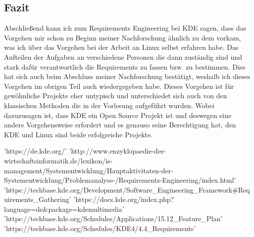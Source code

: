 \subsection{Fazit}
Abschließend kann ich zum Requirements Engineering bei KDE sagen, dass das
Vorgehen mir schon zu Beginn meiner Nachforschung ähnlich zu dem vorkam, was ich
über das Vorgehen bei der Arbeit an Linux selbst erfahren habe. Das Aufteilen
der Aufgaben an verschiedene Personen die dann zuständig sind und stark dafür
verantwortlich die Requirements zu fassen bzw. zu bestimmen. Dies hat sich
auch beim Abschluss meiner Nachforschung bestätigt, weshalb ich dieses Vorgehen
im obrigen Teil auch wiedergegeben habe. Dieses Vorgehen ist für gewöhnliche
Projekte eher untypisch und unterschiedet sich auch von den klassischen Methoden
die in der Vorlesung aufgeführt wurden. %
Wobei dazuzusagen ist, dass KDE ein Open Source Projekt ist und deswegen eine
andere Vorgehensweise erfordert und es genauso seine Berechtigung hat, den KDE
und Linux sind beide erfolgreiche Projekte.
\begin{thebibliography}{x}
   'https://de.kde.org/'
   'http://www.enzyklopaedie-der-wirtschaftsinformatik.de/lexikon/is-management/Systementwicklung/Hauptaktivitaten-der-Systementwicklung/Problemanalyse-/Requirements-Engineering/index.html'
   'https://techbase.kde.org/Development/Software\_Engineering\_Framework\#Requirements\_Gathering'
   'https://docs.kde.org/index.php?language=de\&package=kdemultimedia'
   'https://techbase.kde.org/Schedules/Applications/15.12\_Feature\_Plan'
   'https://techbase.kde.org/Schedules/KDE4/4.4\_Requirements'
\end{thebibliography}


